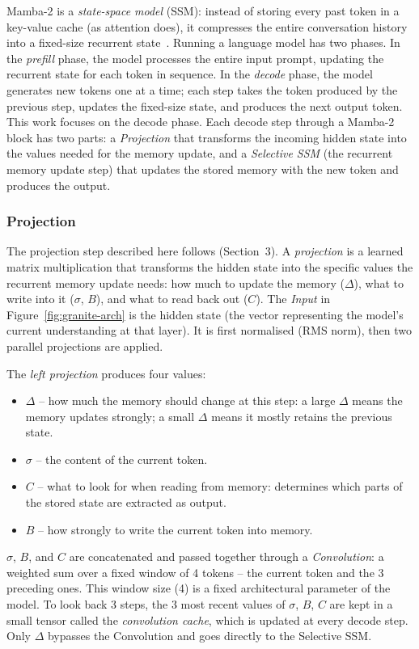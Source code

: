 Mamba-2 is a \emph{state-space model} (SSM): instead of storing every past token in a key-value cache (as attention does), it compresses the entire conversation history into a fixed-size recurrent state~\citep{dao2024transformers}. Running a language model has two phases. In the \emph{prefill} phase, the model processes the entire input prompt, updating the recurrent state for each token in sequence. In the \emph{decode} phase, the model generates new tokens one at a time; each step takes the token produced by the previous step, updates the fixed-size state, and produces the next output token. This work focuses on the decode phase. Each decode step through a Mamba-2 block has two parts: a \emph{Projection} that transforms the incoming hidden state into the values needed for the memory update, and a \emph{Selective SSM} (the recurrent memory update step) that updates the stored memory with the new token and produces the output.

\subsubsection{Projection}

The projection step described here follows \citep{dao2024transformers} (Section~3). A \emph{projection} is a learned matrix multiplication that transforms the hidden state into the specific values the recurrent memory update needs: how much to update the memory ($\Delta$), what to write into it ($\sigma$, $B$), and what to read back out ($C$). The \emph{Input} in Figure~\ref{fig:granite-arch} is the hidden state (the vector representing the model's current understanding at that layer). It is first normalised (RMS norm), then two parallel projections are applied.

The \emph{left projection} produces four values:
\begin{itemize}
  \item $\Delta$ -- how much the memory should change at this step: a large $\Delta$ means the memory updates strongly; a small $\Delta$ means it mostly retains the previous state.
  \item $\sigma$ -- the content of the current token.
  \item $C$ -- what to look for when reading from memory: determines which parts of the stored state are extracted as output.
  \item $B$ -- how strongly to write the current token into memory.
\end{itemize}
$\sigma$, $B$, and $C$ are concatenated and passed together through a \emph{Convolution}: a weighted sum over a fixed window of 4 tokens -- the current token and the 3 preceding ones. This window size (4) is a fixed architectural parameter of the model. To look back 3 steps, the 3 most recent values of $\sigma$, $B$, $C$ are kept in a small tensor called the \emph{convolution cache}, which is updated at every decode step. Only $\Delta$ bypasses the Convolution and goes directly to the Selective SSM.

